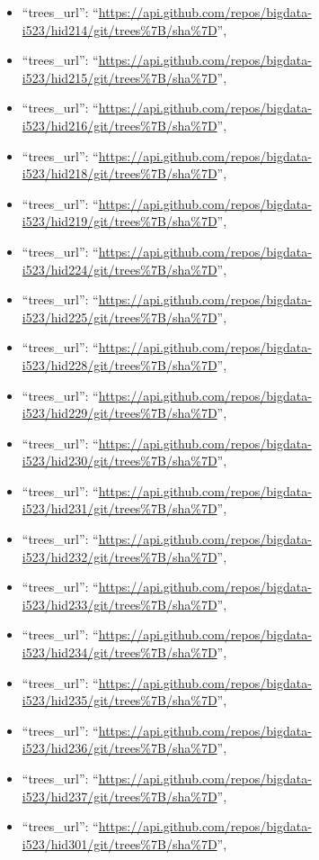 \begin{itemize}
\item
  ``trees\_url'':
  ``\url{https://api.github.com/repos/bigdata-i523/hid214/git/trees\%7B/sha\%7D}'',
\item
  ``trees\_url'':
  ``\url{https://api.github.com/repos/bigdata-i523/hid215/git/trees\%7B/sha\%7D}'',
\item
  ``trees\_url'':
  ``\url{https://api.github.com/repos/bigdata-i523/hid216/git/trees\%7B/sha\%7D}'',
\item
  ``trees\_url'':
  ``\url{https://api.github.com/repos/bigdata-i523/hid218/git/trees\%7B/sha\%7D}'',
\item
  ``trees\_url'':
  ``\url{https://api.github.com/repos/bigdata-i523/hid219/git/trees\%7B/sha\%7D}'',
\item
  ``trees\_url'':
  ``\url{https://api.github.com/repos/bigdata-i523/hid224/git/trees\%7B/sha\%7D}'',
\item
  ``trees\_url'':
  ``\url{https://api.github.com/repos/bigdata-i523/hid225/git/trees\%7B/sha\%7D}'',
\item
  ``trees\_url'':
  ``\url{https://api.github.com/repos/bigdata-i523/hid228/git/trees\%7B/sha\%7D}'',
\item
  ``trees\_url'':
  ``\url{https://api.github.com/repos/bigdata-i523/hid229/git/trees\%7B/sha\%7D}'',
\item
  ``trees\_url'':
  ``\url{https://api.github.com/repos/bigdata-i523/hid230/git/trees\%7B/sha\%7D}'',
\item
  ``trees\_url'':
  ``\url{https://api.github.com/repos/bigdata-i523/hid231/git/trees\%7B/sha\%7D}'',
\item
  ``trees\_url'':
  ``\url{https://api.github.com/repos/bigdata-i523/hid232/git/trees\%7B/sha\%7D}'',
\item
  ``trees\_url'':
  ``\url{https://api.github.com/repos/bigdata-i523/hid233/git/trees\%7B/sha\%7D}'',
\item
  ``trees\_url'':
  ``\url{https://api.github.com/repos/bigdata-i523/hid234/git/trees\%7B/sha\%7D}'',
\item
  ``trees\_url'':
  ``\url{https://api.github.com/repos/bigdata-i523/hid235/git/trees\%7B/sha\%7D}'',
\item
  ``trees\_url'':
  ``\url{https://api.github.com/repos/bigdata-i523/hid236/git/trees\%7B/sha\%7D}'',
\item
  ``trees\_url'':
  ``\url{https://api.github.com/repos/bigdata-i523/hid237/git/trees\%7B/sha\%7D}'',
\item
  ``trees\_url'':
  ``\url{https://api.github.com/repos/bigdata-i523/hid301/git/trees\%7B/sha\%7D}'',

\end{itemize}
